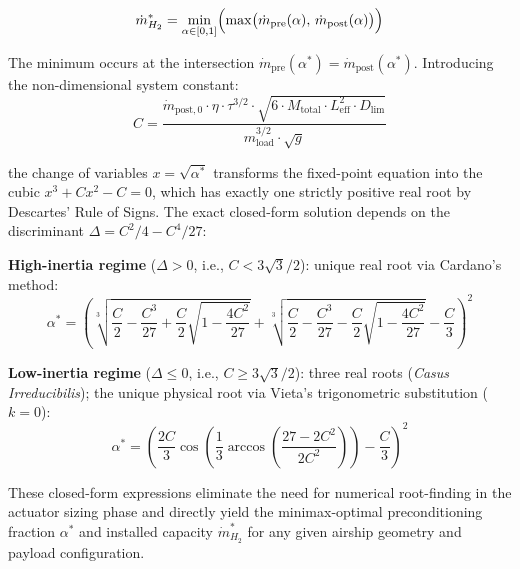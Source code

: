 \begin{equation}
  \dot{m}_{H_2}^* = \min_{\alpha \in [0,1]} \Bigl(\max\bigl(\dot{m}_{\text{pre}}(\alpha),\,\dot{m}_{\text{post}}(\alpha)\bigr)\Bigr)
\end{equation}

The minimum occurs at the intersection $\dot{m}_{\text{pre}}(\alpha^*) = \dot{m}_{\text{post}}(\alpha^*)$. Introducing the non-dimensional system constant:
\begin{equation}
  C = \frac{\dot{m}_{\text{post},0} \cdot \eta \cdot \tau^{3/2} \cdot \sqrt{6 \cdot M_{\text{total}} \cdot L_{\text{eff}}^2 \cdot D_{\text{lim}}}}{m_{\text{load}}^{3/2} \cdot \sqrt{g}}
\end{equation}

the change of variables $x = \sqrt{\alpha^*}$ transforms the fixed-point equation into the cubic $x^3 + C x^2 - C = 0$, which has exactly one strictly positive real root by Descartes' Rule of Signs. The exact closed-form solution depends on the discriminant $\Delta = C^2/4 - C^4/27$:

\textbf{High-inertia regime} ($\Delta > 0$, i.e., $C < 3\sqrt{3}/2$): unique real root via Cardano's method:
\begin{equation}
  \alpha^* = \left( \sqrt[3]{ \frac{C}{2} - \frac{C^3}{27} + \frac{C}{2}\sqrt{1 - \frac{4C^2}{27}} } + \sqrt[3]{ \frac{C}{2} - \frac{C^3}{27} - \frac{C}{2}\sqrt{1 - \frac{4C^2}{27}} } - \frac{C}{3} \right)^2
\end{equation}

\textbf{Low-inertia regime} ($\Delta \leq 0$, i.e., $C \geq 3\sqrt{3}/2$): three real roots (\textit{Casus Irreducibilis}); the unique physical root via Vieta's trigonometric substitution ($k=0$):
\begin{equation}
  \alpha^* = \left( \frac{2C}{3} \cos\!\left( \frac{1}{3} \arccos\!\left( \frac{27 - 2C^2}{2C^2} \right) \right) - \frac{C}{3} \right)^2
\end{equation}

These closed-form expressions eliminate the need for numerical root-finding in the actuator sizing phase and directly yield the minimax-optimal preconditioning fraction $\alpha^*$ and installed capacity $\dot{m}_{H_2}^*$ for any given airship geometry and payload configuration.
